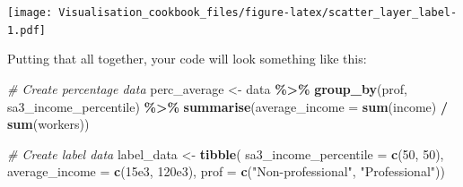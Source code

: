 \documentclass[
]{book}
\newenvironment{Shaded}{\begin{snugshade}}{\end{snugshade}}
\newcommand{\CommentTok}[1]{\textcolor[rgb]{0.56,0.35,0.01}{\textit{#1}}}
\newcommand{\DataTypeTok}[1]{\textcolor[rgb]{0.13,0.29,0.53}{#1}}
\newcommand{\DecValTok}[1]{\textcolor[rgb]{0.00,0.00,0.81}{#1}}
\newcommand{\FloatTok}[1]{\textcolor[rgb]{0.00,0.00,0.81}{#1}}
\newcommand{\KeywordTok}[1]{\textcolor[rgb]{0.13,0.29,0.53}{\textbf{#1}}}
\newcommand{\NormalTok}[1]{#1}
\newcommand{\OperatorTok}[1]{\textcolor[rgb]{0.81,0.36,0.00}{\textbf{#1}}}
\newcommand{\StringTok}[1]{\textcolor[rgb]{0.31,0.60,0.02}{#1}}
\begin{document}
\texttt{[image: Visualisation\_cookbook\_files/figure-latex/scatter\_layer\_label-1.pdf]}

Putting that all together, your code will look something like this:

\begin{Shaded}
\begin{Highlighting}[]
\CommentTok{\# Create percentage data}
\NormalTok{perc\_average \textless{}{-}}\StringTok{ }\NormalTok{data }\OperatorTok{\%\textgreater{}\%}\StringTok{ }
\StringTok{  }\KeywordTok{group\_by}\NormalTok{(prof, sa3\_income\_percentile) }\OperatorTok{\%\textgreater{}\%}\StringTok{ }
\StringTok{  }\KeywordTok{summarise}\NormalTok{(}\DataTypeTok{average\_income =} \KeywordTok{sum}\NormalTok{(income) }\OperatorTok{/}\StringTok{ }\KeywordTok{sum}\NormalTok{(workers))}

\CommentTok{\# Create label data}
\NormalTok{label\_data \textless{}{-}}\StringTok{ }\KeywordTok{tibble}\NormalTok{(}
  \DataTypeTok{sa3\_income\_percentile =} \KeywordTok{c}\NormalTok{(}\DecValTok{50}\NormalTok{, }\DecValTok{50}\NormalTok{),}
  \DataTypeTok{average\_income =} \KeywordTok{c}\NormalTok{(}\FloatTok{15e3}\NormalTok{, }\FloatTok{120e3}\NormalTok{),}
  \DataTypeTok{prof =}  \KeywordTok{c}\NormalTok{(}\StringTok{"Non{-}professional"}\NormalTok{, }\StringTok{"Professional"}\NormalTok{))}



\end{Highlighting}
\end{Shaded}
\end{document}
